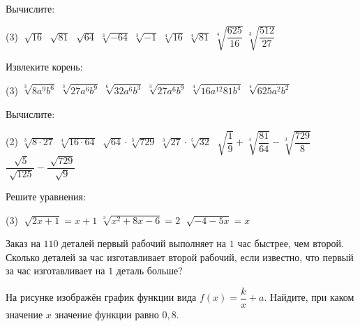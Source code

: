 \begin{consultation}
	\begin{listofex}
		\item Вычислите:
		\begin{tasks}(3)
			\task \( \sqrt[]{16} \)
			\task \( \sqrt[]{81} \)
			\task \( \sqrt[]{64} \)
			\task \( \sqrt[3]{-64} \)
			\task \( \sqrt[3]{-1} \)
			\task \( \sqrt[4]{16} \)
			\task \( \sqrt[4]{81} \)
			\task \( \sqrt[4]{\dfrac{625}{16}} \)
			\task \( \sqrt[3]{\dfrac{512}{27}} \)
		\end{tasks}
		\item Извлеките корень:
		\begin{tasks}(3)
			\task \( \sqrt[3]{ 8a^9b^6 } \)
			\task \( \sqrt[3]{ 27a^6b^9 } \)
			\task \( \sqrt[6]{ 32a^{6}b^{3} } \)
			\task \( \sqrt[3]{ 27a^6b^9 } \)
			\task \( \sqrt[4]{ 16a^{12}81b^{4} } \)
			\task \( \sqrt[4]{ 625a^2b^2 } \)
		\end{tasks}
		\item Вычислите:
		\begin{tasks}(2)
			\task \( \sqrt[3]{8 \cdot 27} \)
			\task \( \sqrt[4]{16 \cdot 64} \)
			\task \( \sqrt[]{64} \cdot \sqrt[3]{729} \)
			\task \( \sqrt[3]{27} \cdot \sqrt[5]{32} \)
			\task \( \sqrt[]{\dfrac{1}{9}} +\sqrt[4]{\dfrac{81}{64}} - \sqrt[3]{\dfrac{729}{8}} \)
			\task \( \dfrac{\sqrt[]{5}}{\sqrt[]{125}} - \dfrac{\sqrt[]{729}}{\sqrt[]{9}} \)
		\end{tasks}
		\item Решите уравнения:
		\begin{tasks}(3)
			\task \( \sqrt[]{2x+1} = x+1 \)
			\task \( \sqrt[3]{x^2+8x-6}=2 \)
			\task \( \sqrt[]{-4-5x}=x \)
		\end{tasks}
		\item Заказ на \(110\) деталей первый рабочий выполняет на \(1\) час быстрее, чем второй. Сколько деталей за час изготавливает второй рабочий, если известно, что первый за час изготавливает на \(1\) деталь больше?
		\item
		\begin{minipage}[t]{0.28\textwidth}
			На рисунке изображён график функции вида \(f(x)=\dfrac{k}{x}+a\). Найдите, при каком значение \( x \) значение функции равно \(0,8\).
		\end{minipage}
		\begin{minipage}[t]{\picwidth}

\end{minipage}
\end{listofex}
\end{consultation}

